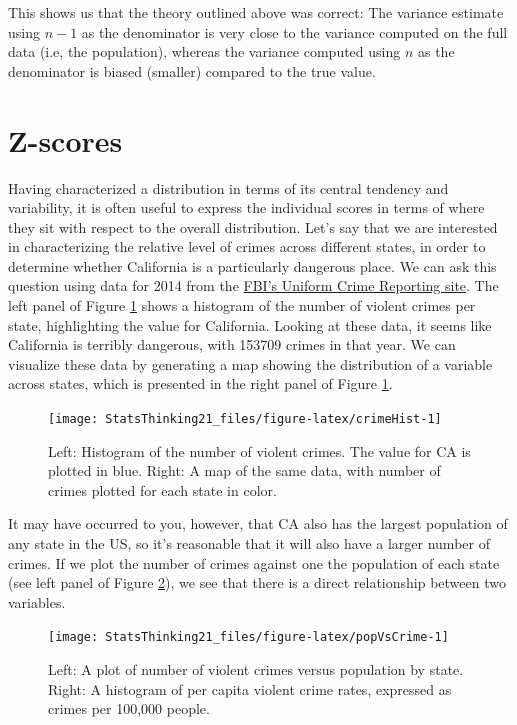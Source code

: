 \documentclass[12pt,]{book}
\theoremstyle{definition}
\theoremstyle{definition}
\theoremstyle{definition}
\theoremstyle{remark}
\begin{document}
This shows us that the theory outlined above was correct: The variance estimate using \(n - 1\) as the denominator is very close to the variance computed on the full data (i.e, the population), whereas the variance computed using \(n\) as the denominator is biased (smaller) compared to the true value.

\hypertarget{z-scores}{%
\section{Z-scores}\label{z-scores}}

Having characterized a distribution in terms of its central tendency and variability, it is often useful to express the individual scores in terms of where they sit with respect to the overall distribution. Let's say that we are interested in characterizing the relative level of crimes across different states, in order to determine whether California is a particularly dangerous place. We can ask this question using data for 2014 from the \href{https://www.ucrdatatool.gov/Search/Crime/State/RunCrimeOneYearofData.cfm}{FBI's Uniform Crime Reporting site}. The left panel of Figure \ref{fig:crimeHist} shows a histogram of the number of violent crimes per state, highlighting the value for California. Looking at these data, it seems like California is terribly dangerous, with 153709 crimes in that year. We can visualize these data by generating a map showing the distribution of a variable across states, which is presented in the right panel of Figure \ref{fig:crimeHist}.

\begin{figure}
\texttt{[image: StatsThinking21\_files/figure-latex/crimeHist-1]} \caption{Left: Histogram of the number of violent crimes.  The value for CA is plotted in blue. Right: A map of the same data, with number of crimes plotted for each state in color.}\label{fig:crimeHist}
\end{figure}

It may have occurred to you, however, that CA also has the largest population of any state in the US, so it's reasonable that it will also have a larger number of crimes. If we plot the number of crimes against one the population of each state (see left panel of Figure \ref{fig:popVsCrime}), we see that there is a direct relationship between two variables.

\begin{figure}
\texttt{[image: StatsThinking21\_files/figure-latex/popVsCrime-1]} \caption{Left: A plot of number of violent crimes versus population by state. Right: A histogram of per capita violent crime rates, expressed as crimes per 100,000 people.}\label{fig:popVsCrime}
\end{figure}
\end{document}
